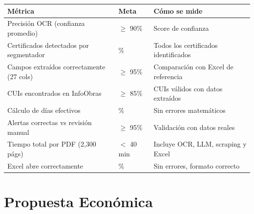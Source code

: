 \documentclass[11pt,a4paper]{article}
\begin{document}
\begin{center}
\begin{tabular}{|>{\raggedright\arraybackslash}m{5.5cm}|>{\centering\arraybackslash}m{2.5cm}|>{\raggedright\arraybackslash}m{4.5cm}|}
\hline
\textbf{Métrica} & \textbf{Meta} & \textbf{Cómo se mide} \\
\hline
Precisión OCR (confianza promedio) & $\geq$ 90\% & Score de confianza \\
\hline
Certificados detectados por segmentador & 100\% & Todos los certificados identificados \\
\hline
Campos extraídos correctamente (27 cols) & $\geq$ 95\% & Comparación con Excel de referencia \\
\hline
CUIs encontrados en InfoObras & $\geq$ 85\% & CUIs válidos con datos extraídos \\
\hline
Cálculo de días efectivos & 100\% & Sin errores matemáticos \\
\hline
Alertas correctas vs revisión manual & $\geq$ 95\% & Validación con datos reales \\
\hline
Tiempo total por PDF (2,300 págs) & $<$ 40 min & Incluye OCR, LLM, scraping y Excel \\
\hline
Excel abre correctamente & 100\% & Sin errores, formato correcto \\
\hline
\end{tabular}
\end{center}

\section{Propuesta Económica}

%
%
%
%
\end{document}
